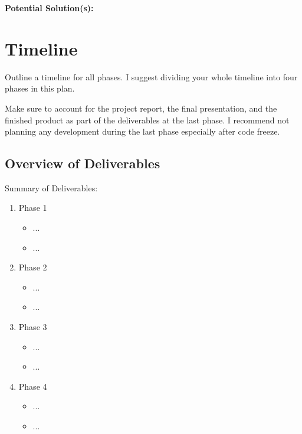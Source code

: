 \documentclass{article}
\begin{document}
   \textbf{Potential Solution(s): }

\section{Timeline}
Outline a timeline for all phases. I suggest dividing your whole timeline into four phases in this plan.

Make sure to account for the project report, the final presentation, and the finished product as part of the deliverables at the last phase.
I recommend not planning any development during the last phase especially after code freeze.
\subsection{Overview of Deliverables}
Summary of Deliverables: 

\begin{enumerate}
   \item Phase 1
   \begin{itemize}
     \item ...
     \item ...
   \end{itemize}
   \item Phase 2
   \begin{itemize}
     \item ...
     \item ...
   \end{itemize}
   \item Phase 3
   \begin{itemize}
     \item ...
     \item ...
   \end{itemize}
   \item Phase 4
   \begin{itemize}
     \item ...
     \item ...
   \end{itemize}
\end{enumerate}


\end{document}

